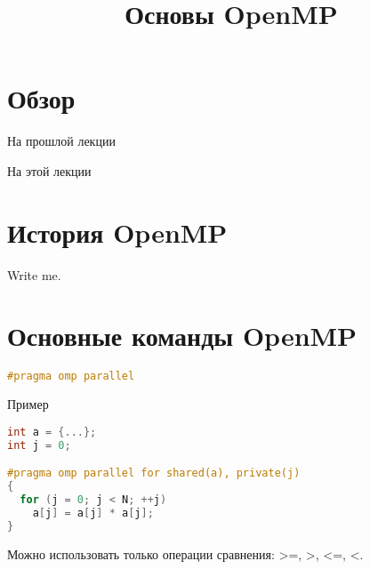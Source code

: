 

\title{Основы OpenMP}



\section*{Обзор}

\begin{frame}
\tableofcontents
\end{frame} 

\begin{frame}{На прошлой лекции}
\end{frame}

\begin{frame}{На этой лекции}
\titlepage
\end{frame}


\section{История OpenMP}

\begin{frame}

\todo Write me.

\end{frame}

\section{Основные команды OpenMP}

\begin{frame}[fragile]

\begin{lstlisting}[language=C++,basicstyle=\ttfamily,keywordstyle=\color{blue},basicstyle=\scriptsize]
#pragma omp parallel
\end{lstlisting}

\end{frame}

\begin{frame}[fragile]{Пример}

\begin{lstlisting}[language=C++,basicstyle=\ttfamily,keywordstyle=\color{blue},basicstyle=\scriptsize]
int a = {...};
int j = 0;

#pragma omp parallel for shared(a), private(j)
{
  for (j = 0; j < N; ++j)
    a[j] = a[j] * a[j];
}
\end{lstlisting}

Можно использовать только операции сравнения: >=, >, <=, <.

\end{frame}

